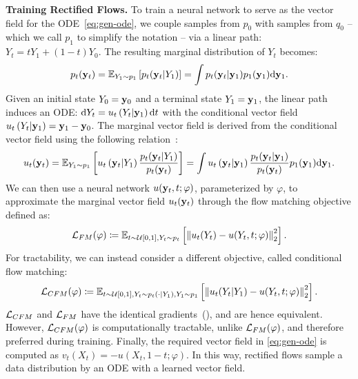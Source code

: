 \documentclass{article} %
\theoremstyle{plain}
\newcommand{\deriv}{\mathrm{d}}
\begin{document}
\noindent\textbf{Training Rectified Flows. } To train a neural network to serve as the vector field for the ODE~\eqref{eq:gen-ode}, we couple samples from $p_0$ with samples from $q_0$ -- which we call $p_1$ to simplify the notation -- via a linear path: $Y_t = t Y_1 + (1-t)Y_0$. The resulting marginal distribution of $Y_t$ becomes:
\begin{align}
    \label{eq:p-yt-marginal}
    p_t(\rvy_t) = \E_{Y_1 \sim p_1}\left[p_t(\rvy_t|Y_1) \right] = \int p_t(\rvy_t|\rvy_1) p_1(\rvy_1) \deriv\rvy_1.
\end{align}
Given an initial state $Y_0 = {\mathbf{y}}_0$ and a terminal state $Y_1={\mathbf{y}}_1$, the linear path induces an ODE: $\deriv Y_t = u_t\left(Y_t|\rvy_1\right) \deriv t$ with the conditional vector field $u_t\left(Y_t|{\mathbf{y}}_1\right) = {\mathbf{y}}_1 - {\mathbf{y}}_0$.
The marginal vector field is derived from the conditional vector field using the following relation~\citep{lipman2022flow}:
\begin{align}
    \label{eq:ut-marginal}
    u_t(\rvy_t) = \E_{Y_1 \sim p_1}\left[u_t\left(\rvy_t|Y_1\right) \frac{p_t(\rvy_t|Y_1)}{p_t(\rvy_t)} \right]
    = \int u_t\left(\rvy_t|\rvy_1\right) \frac{p_t(\rvy_t|\rvy_1)}{p_t(\rvy_t)} p_1(\rvy_1) \deriv \rvy_1.
\end{align}
We can then use a neural network $u({\mathbf{y}}_t,t;\varphi)$, parameterized by $\varphi$, to approximate the marginal vector field $u_t({\mathbf{y}}_t)$ through the flow matching objective defined as:
\begin{align}
    \label{eq:fm-loss}
    {\mathcal{L}}_{FM}(\varphi)\coloneqq \mathbb{E}_{t\sim {\mathcal{U}}[0,1],Y_t\sim p_t}\left[\left\| u_t(Y_t) - u(Y_t,t;\varphi) \right\|_2^2\right].
\end{align}
For tractability, we can instead consider a different objective, called conditional flow matching:
\begin{align}
    \label{eq:cfm-loss}
    {\mathcal{L}}_{CFM}(\varphi)\coloneqq \mathbb{E}_{t\sim {\mathcal{U}}[0,1],Y_t\sim p_t(\cdot|Y_1), Y_1 \sim p_1}\left[\left\| u_t(Y_t|Y_1) - u(Y_t,t;\varphi) \right\|_2^2\right].
\end{align}
${\mathcal{L}}_{CFM}$ and ${\mathcal{L}}_{FM}$ have the identical gradients~(\citealp[Theorem 2]{lipman2022flow}), and are hence equivalent.
However, ${\mathcal{L}}_{CFM}(\varphi)$ is computationally tractable, unlike ${\mathcal{L}}_{FM}(\varphi)$, and therefore preferred during training. 
Finally, the required vector field in \eqref{eq:gen-ode} is computed as $v_t\left(X_t\right) = -u(X_t,1-t;\varphi)$. 
In this way, rectified flows sample a data distribution by an ODE with a learned vector field.
\end{document}
